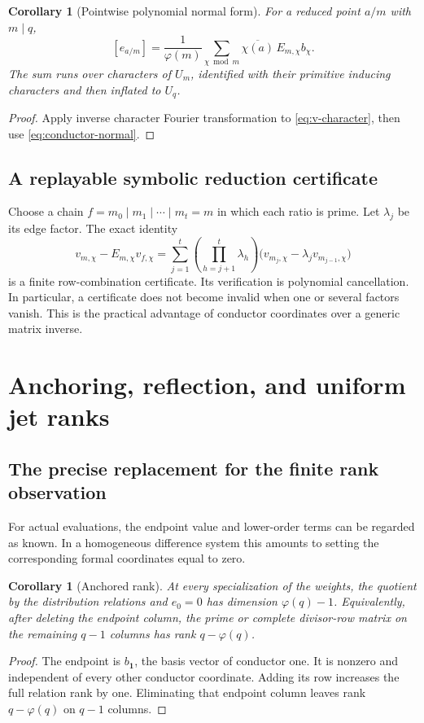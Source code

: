 \documentclass[11pt]{article}
\numberwithin{equation}{section}
\newtheorem{corollary}[theorem]{Corollary}
\theoremstyle{definition}
\theoremstyle{remark}
\begin{document}
\begin{corollary}[Pointwise polynomial normal form]\label{cor:point-normal}
For a reduced point $a/m$ with $m\mid q$,
\begin{equation}\label{eq:point-normal}
 [e_{a/m}]=\frac1{\varphi(m)}
 \sum_{\chi\bmod m}\overline{\chi(a)}\,E_{m,\chi}b_\chi.
\end{equation}
The sum runs over characters of $U_m$, identified with their primitive
inducing characters and then inflated to $U_q$.
\end{corollary}
\begin{proof}
Apply inverse character Fourier transformation to
\eqref{eq:v-character}, then use \eqref{eq:conductor-normal}.
\end{proof}

\subsection{A replayable symbolic reduction certificate}
Choose a chain
$f=m_0\mid m_1\mid\cdots\mid m_t=m$ in which each ratio is prime.
Let $\lambda_j$ be its edge factor. The exact identity
\begin{equation}\label{eq:telescoping-certificate}
 v_{m,\chi}-E_{m,\chi}v_{f,\chi}
 =\sum_{j=1}^t\left(\prod_{h=j+1}^t\lambda_h\right)
 \bigl(v_{m_j,\chi}-\lambda_jv_{m_{j-1},\chi}\bigr)
\end{equation}
is a finite row-combination certificate. Its verification is polynomial
cancellation. In particular, a certificate does not become invalid when
one or several factors vanish. This is the practical advantage of
conductor coordinates over a generic matrix inverse.

\section{Anchoring, reflection, and uniform jet ranks}\label{sec:jets}

\subsection{The precise replacement for the finite rank observation}
For actual evaluations, the endpoint value and lower-order terms can be
regarded as known. In a homogeneous difference system this amounts to
setting the corresponding formal coordinates equal to zero.

\begin{corollary}[Anchored rank]\label{cor:anchored}
At every specialization of the weights, the quotient by the distribution
relations and $e_0=0$ has dimension $\varphi(q)-1$. Equivalently, after
deleting the endpoint column, the prime or complete divisor-row matrix
on the remaining $q-1$ columns has rank $q-\varphi(q)$.
\end{corollary}
\begin{proof}
The endpoint is $b_{\mathbf1}$, the basis vector of conductor one.
It is nonzero and independent of every other conductor coordinate.
Adding its row increases the full relation rank by one. Eliminating
that endpoint column leaves rank $q-\varphi(q)$ on $q-1$ columns.
\end{proof}
\end{document}
